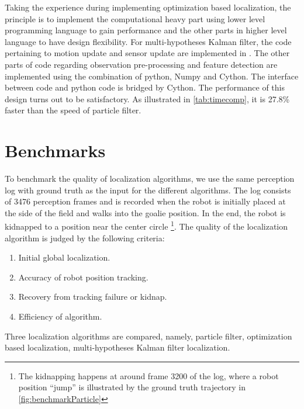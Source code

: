 Taking the experience during implementing optimization based localization, the principle is to implement the computational heavy part using lower level programming language to gain performance and the other parts in higher level language to have design flexibility.
For multi-hypotheses Kalman filter, the code pertaining to motion update and sensor update are implemented in \cpp{}. The other parts of code regarding observation pre-processing and feature detection are implemented using the combination of python, Numpy and Cython. The interface between \cpp{} code and python code is bridged by Cython. The performance of this design turns out to be satisfactory. As illustrated in \autoref{tab:timecomp}, it is 27.8\% faster than the speed of particle filter.

\section{Benchmarks}
\label{sec:Benchmark}
To benchmark the quality of localization algorithms, we use the same perception log with ground truth as the input for the different algorithms. The log consists of 3476 perception frames and is recorded when the robot is initially placed at the side of the field and walks into the goalie position. In the end, the robot is kidnapped to a position near the center circle \footnote{The kidnapping happens at around frame 3200 of the log, where a robot position ``jump'' is illustrated by the ground truth trajectory in \autoref{fig:benchmarkParticle}}. The quality of the localization algorithm is judged by the following criteria: 
\begin{enumerate}
  \item Initial global localization.
  \item Accuracy of robot position tracking.
  \item Recovery from tracking failure or kidnap.
  \item Efficiency of algorithm.
\end{enumerate}

Three localization algorithms are compared, namely, particle filter, optimization based localization, multi-hypotheses Kalman filter localization.

